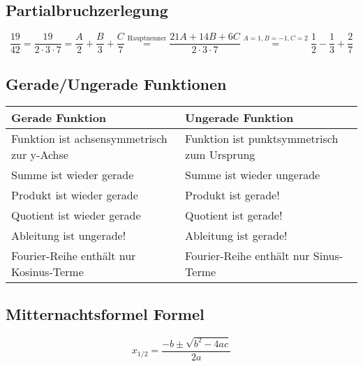 \documentclass[12pt]{article}
\begin{document}
\subsection{Partialbruchzerlegung}
\begin{equation*}
	\frac{19}{42}=\frac{19}{2\cdot3\cdot7}=\frac{A}{2}+\frac{B}{3}+\frac{C}{7}\stackrel{\text{Hauptnenner}}{=}\frac{21A+14B+6C}{2\cdot3\cdot7}\stackrel{A=1,B=-1,C=2}{=}\frac{1}{2}-\frac{1}{3}+\frac{2}{7}
\end{equation*}
\subsection{Gerade/Ungerade Funktionen}
\begin{table}[H]
	\centering
	\begin{tabular}{|l|l|}
		\hline
		\textbf{Gerade Funktion} & \textbf{Ungerade Funktion}\\
		\hline\hline
		Funktion ist achsensymmetrisch zur y-Achse & Funktion ist punktsymmetrisch zum Ursprung\\\hline
		Summe ist wieder gerade & Summe ist wieder ungerade \\\hline
		Produkt ist wieder gerade & Produkt ist gerade!\\\hline
		Quotient ist wieder gerade & Quotient ist gerade!\\\hline
		Ableitung ist ungerade! & Ableitung ist gerade!\\\hline
		Fourier-Reihe enthält nur Kosinus-Terme & Fourier-Reihe enthält nur Sinus-Terme\\\hline
	\end{tabular}
\end{table}
\subsection{Mitternachtsformel Formel}
\begin{equation*}
	x_{1/2}=\frac{-b\pm\sqrt{b^2-4ac}}{2a}
\end{equation*}
\end{document}
